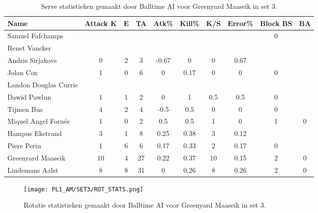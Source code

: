 \begin{table}[ht!]
  \centering
  \scriptsize
  \begin{tabular}{|l|c|c|c|c|c|c|c|c|c|} \hline
    \textbf{Name} & Attack K & E & TA & Atk\% & Kill\% & K/S & Error\% & Block BS & BA \\ \hline
    Samuel Fafchamps &   &   &   &   &   &   &   & 0 &   \\
    Renet Vancker &   &   &   &   &   &   &   &   &   \\
    Andris Sirjakovs & 0 & 2 & 3 & -0.67 & 0 & 0 & 0.67 &   &   \\
    Jolan Cox & 1 & 0 & 6 & 0 & 0.17 & 0 & 0 & 0 &   \\
    Landon Douglas Currie &   &   &   &   &   &   &   &   &   \\
    Dawid Pawlun & 1 & 1 & 2 & 0 & 1 & 0.5 & 0.5 & 0 &   \\
    Tijmen Bus & 4 & 2 & 4 & -0.5 & 0.5 & 0 & 0 & 0 &   \\
    Miquel Angel Fornés & 1 & 0 & 2 & 0.5 & 0.5 & 1 & 0 & 1 & 0 \\
    Hampus Ekstrand & 3 & 1 & 8 & 0.25 & 0.38 & 3 & 0.12 &   &   \\
    Piere Perin & 1 & 6 & 6 & 0.17 & 0.33 & 2 & 0.17 & 0 &   \\
    Greenyard Maaseik & 10 & 4 & 27 & 0.22 & 0.37 & 10 & 0.15 & 2 & 0 \\
    Lindemans Aalst & 8 & 8 & 31 & 0 & 0.26 & 8 & 0.26 & 2 & 0 \\ \hline
  \end{tabular}
  \caption[Attacking en blocking statistieken gemaakt door Balltime AI voor Greenyard Maaseik in set 3]{\label{tab:PL1AttBlockGreenyard3}Serve statistieken gemaakt door Balltime AI voor Greenyard Maaseik in set 3.}
\end{table}


\begin{figure}
  \centering
  \texttt{[image: PL1\_AM/SET3/ROT\_STATS.png]}
  \caption{\label{fig:PL1_ROT_STATS_3}Rotatie statistieken gemaakt door Balltime AI voor Greenyard Maaseik in set 3.}
\end{figure}
